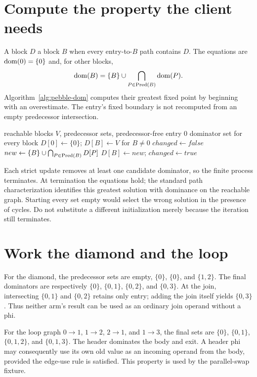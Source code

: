 \section{Compute the property the client needs}
\label{sec:pebble-dom-equations}
A block $D$  a block $B$ when every entry-to-$B$ path contains $D$.
The equations are $\operatorname{dom}(0)=\{0\}$ and, for other blocks,
\[
  \operatorname{dom}(B)=\{B\}\cup\bigcap_{P\in\operatorname{Pred}(B)}\operatorname{dom}(P).
\]
Algorithm~\ref{alg:pebble-dom} computes their greatest fixed point by beginning with an overestimate.
The entry's fixed boundary is not recomputed from an empty predecessor intersection.

\begin{algorithm}[htbp]
\caption{Dominator sets for a verified, entry-reachable graph.}
\label{alg:pebble-dom}
\begin{pseudocode}
\Require reachable blocks $V$, predecessor sets, predecessor-free entry 0
\Ensure dominator set for every block
\State $D[0]\gets\{0\}$; $D[B]\gets V$ for $B\ne0$
\Repeat
\State $changed\gets false$
\State $new\gets\{B\}\cup\bigcap_{P\in\operatorname{Pred}(B)}D[P]$
\State $D[B]\gets new$; $changed\gets true$
\EndIf
\EndFor
{}
\end{pseudocode}
\end{algorithm}

Each strict update removes at least one candidate dominator, so the finite process terminates.
At termination the equations hold; the standard path characterization identifies this greatest solution with dominance on the reachable graph.
Starting every set empty would select the wrong solution in the presence of cycles.
Do not substitute a different initialization merely because the iteration still terminates.

\section{Work the diamond and the loop}
\label{sec:pebble-dom-worked}
For the diamond, the predecessor sets are empty, $\{0\}$, $\{0\}$, and $\{1,2\}$.
The final dominators are respectively $\{0\}$, $\{0,1\}$, $\{0,2\}$, and $\{0,3\}$.
At the join, intersecting $\{0,1\}$ and $\{0,2\}$ retains only entry; adding the join itself yields $\{0,3\}$.
Thus neither arm's result can be used as an ordinary join operand without a phi.

For the loop graph $0\to1$, $1\to2$, $2\to1$, and $1\to3$, the final sets are $\{0\}$, $\{0,1\}$, $\{0,1,2\}$, and $\{0,1,3\}$.
The header dominates the body and exit.
A header phi may consequently use its own old value as an incoming operand from the body, provided the edge-use rule is satisfied.
This property is used by the parallel-swap fixture.

